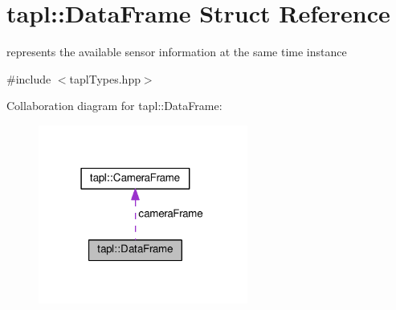 \hypertarget{structtapl_1_1DataFrame}{}\section{tapl\+:\+:Data\+Frame Struct Reference}
\label{structtapl_1_1DataFrame}


represents the available sensor information at the same time instance  




{\ttfamily \#include $<$tapl\+Types.\+hpp$>$}



Collaboration diagram for tapl\+:\+:Data\+Frame\+:\nopagebreak
\begin{figure}[H]
\begin{center}
\leavevmode
\includegraphics[width=195pt]{structtapl_1_1DataFrame__coll__graph}
\end{center}
\end{figure}
